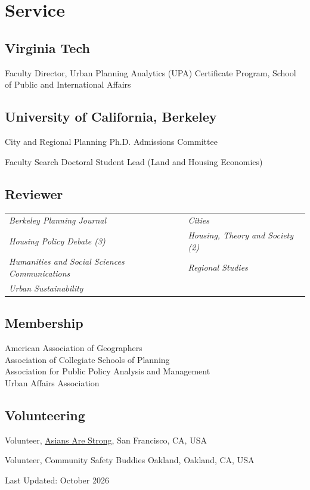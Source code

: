 \documentclass[11pt,letterpaper]{article}
\begin{document}
\section{Service}

\subsection{Virginia Tech}
\begin{tablist}
  \item[2026--] \tab{}Faculty Director, Urban Planning Analytics (UPA) Certificate Program, School of Public and International Affairs
\end{tablist}

\subsection{University of California, Berkeley}
\begin{tablist}
  \item[2024--25] \tab{}City and Regional Planning Ph.D. Admissions Committee
  \item[2023] \tab{}Faculty Search Doctoral Student Lead (Land and Housing Economics)
\end{tablist}

\subsection{Reviewer}
\begin{tabular}{@{}p{} p{}@{}}
\emph{Berkeley Planning Journal} & \emph{Cities}\\
\emph{Housing Policy Debate (3)} & \emph{Housing, Theory and Society (2)}\\
\emph{Humanities and Social Sciences Communications} & \emph{Regional Studies}\\
\emph{Urban Sustainability} &
\end{tabular}

\subsection{Membership}
American Association of Geographers\\
Association of Collegiate Schools of Planning\\
Association for Public Policy Analysis and Management\\
Urban Affairs Association

\subsection{Volunteering}
\begin{tablist}
  \item[2024--26] \tab{}Volunteer, \href{https://asiansarestrong.org/}{Asians Are Strong}, San Francisco, CA, USA
  \item[2024--25] \tab{}Volunteer, Community Safety Buddies Oakland, Oakland, CA, USA
\end{tablist}

\smallskip
{\footnotesize Last Updated: October 2026}
\end{document}
